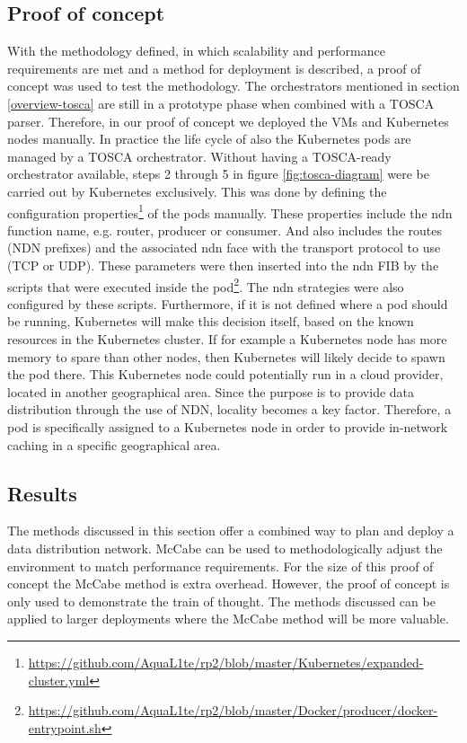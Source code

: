 \subsection{Proof of concept}
\label{planning-poc}
With the methodology defined, in which scalability and performance requirements are met and a method for deployment is described, a proof of concept was used to test the methodology. The orchestrators mentioned in section \ref{overview-tosca} are still in a prototype phase when combined with a TOSCA parser. Therefore, in our proof of concept we deployed the VMs and Kubernetes nodes manually. In practice the life cycle of also the Kubernetes pods are managed by a TOSCA orchestrator. Without having a TOSCA-ready orchestrator available, steps 2 through 5 in figure \ref{fig:tosca-diagram} were be carried out by Kubernetes exclusively. This was done by defining the configuration properties\footnote{\url{https://github.com/AquaL1te/rp2/blob/master/Kubernetes/expanded-cluster.yml}} of the pods manually. These properties include the \gls{ndn} function name, e.g. router, producer or consumer. And also includes the routes (NDN prefixes) and the associated \gls{ndn} face with the transport protocol to use (TCP or UDP). These parameters were then inserted into the \gls{ndn} FIB by the scripts that were executed inside the pod\footnote{\url{https://github.com/AquaL1te/rp2/blob/master/Docker/producer/docker-entrypoint.sh}}. The \gls{ndn} strategies were also configured by these scripts. Furthermore, if it is not defined where a pod should be running, Kubernetes will make this decision itself, based on the known resources in the Kubernetes cluster. If for example a Kubernetes node has more memory to spare than other nodes, then Kubernetes will likely decide to spawn the pod there. This Kubernetes node could potentially run in a cloud provider, located in another geographical area. Since the purpose is to provide data distribution through the use of NDN, locality becomes a key factor. Therefore, a pod is specifically assigned to a Kubernetes node in order to provide in-network caching in a specific geographical area.

\subsection{Results}
The methods discussed in this section offer a combined way to plan and deploy a data distribution network. McCabe can be used to methodologically adjust the environment to match performance requirements. For the size of this proof of concept the McCabe method is extra overhead. However, the proof of concept is only used to demonstrate the train of thought. The methods discussed can be applied to larger deployments where the McCabe method will be more valuable.

